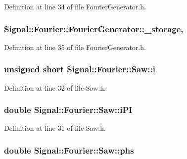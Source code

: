 Definition at line 34 of file Fourier\+Generator.\+h.

\hypertarget{classSignal_1_1Fourier_1_1FourierGenerator_ab6e6b79cf56e31c9a1b5766f357f8cfb}{
\subsubsection[{\+\_\+storage}]{ Signal\+::\+Fourier\+::\+Fourier\+Generator\+::\+\_\+storage\hspace{0.3cm}{\ttfamily [protected]}, {\ttfamily [inherited]}}}\label{classSignal_1_1Fourier_1_1FourierGenerator_ab6e6b79cf56e31c9a1b5766f357f8cfb}


Definition at line 35 of file Fourier\+Generator.\+h.

\hypertarget{classSignal_1_1Fourier_1_1Saw_a1e575a999b316e51cb3a4f8af962749c}{
\subsubsection[{i}]{\setlength{\rightskip}{0pt plus 5cm}unsigned short Signal\+::\+Fourier\+::\+Saw\+::i\hspace{0.3cm}{\ttfamily [protected]}}}\label{classSignal_1_1Fourier_1_1Saw_a1e575a999b316e51cb3a4f8af962749c}


Definition at line 32 of file Saw.\+h.

\hypertarget{classSignal_1_1Fourier_1_1Saw_a70dccb676ad58a1b6ef4b053081bec3f}{
\subsubsection[{i\+P\+I}]{\setlength{\rightskip}{0pt plus 5cm}double Signal\+::\+Fourier\+::\+Saw\+::i\+P\+I\hspace{0.3cm}{\ttfamily [protected]}}}\label{classSignal_1_1Fourier_1_1Saw_a70dccb676ad58a1b6ef4b053081bec3f}


Definition at line 31 of file Saw.\+h.

\hypertarget{classSignal_1_1Fourier_1_1Saw_a3c26ea58f2340c1d9a296937cec78a86}{
\subsubsection[{phs}]{\setlength{\rightskip}{0pt plus 5cm}double Signal\+::\+Fourier\+::\+Saw\+::phs\hspace{0.3cm}{\ttfamily [protected]}}}\label{classSignal_1_1Fourier_1_1Saw_a3c26ea58f2340c1d9a296937cec78a86}


